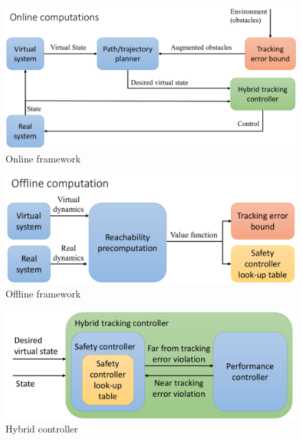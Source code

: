 \begin{figure}
\includegraphics[width=\columnwidth]{fig/framework_online}
\caption{Online framework}
\label{fig:fw_online}
\end{figure}

\begin{figure}
  \includegraphics[width=\columnwidth]{fig/framework_offline}
  \caption{Offline framework}
  \label{fig:fw_offline}
\end{figure}

\begin{figure}
  \includegraphics[width=\columnwidth]{fig/hybrid_controller}
  \caption{Hybrid controller}
  \label{fig:hybrid_ctrl}
\end{figure}